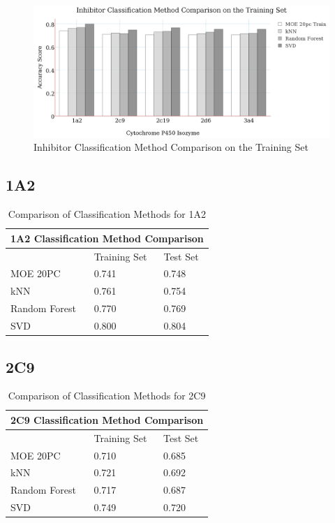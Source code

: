 \begin{figure}[!h]
\includegraphics[width=1\textwidth]{../img/method_comparison_training_set.png}
\caption{Inhibitor Classification Method Comparison on the Training Set}
\end{figure}

\subsection{1A2}

\begin{table}[h]
\begin{tabular}{|l|l|l|}
\hline
\multicolumn{3}{|c|}{1A2 Classification Method Comparison} \\ \hline
          & Training Set & Test Set \\ \hline
MOE 20PC  & 0.741        & 0.748    \\ \hline
kNN       & 0.761        & 0.754    \\ \hline
Random Forest & 0.770    & 0.769    \\ \hline
SVD       & 0.800        & 0.804    \\ \hline
\end{tabular}
\caption{Comparison of Classification Methods for 1A2}
\end{table}

\subsection{2C9}

\begin{table}[h]
\begin{tabular}{|l|l|l|}
\hline
\multicolumn{3}{|c|}{2C9 Classification Method Comparison} \\ \hline
          & Training Set & Test Set \\ \hline
MOE 20PC  & 0.710        & 0.685    \\ \hline
kNN       & 0.721        & 0.692    \\ \hline
Random Forest & 0.717    & 0.687    \\ \hline
SVD       & 0.749        & 0.720    \\ \hline
\end{tabular}
\caption{Comparison of Classification Methods for 2C9}
\end{table}

